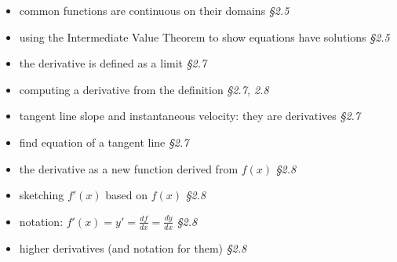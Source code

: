 \documentclass[12pt]{article}
\begin{document}
\begin{itemize}
\begin{itemize}
    \end{itemize}
\item common functions are continuous on their domains  \hfill \emph{\S 2.5}
\item using the Intermediate Value Theorem to show equations have solutions \hfill \emph{\S 2.5}
\item the derivative is defined as a limit  \hfill \emph{\S 2.7}
\item computing a derivative from the definition  \hfill \emph{\S 2.7, 2.8}
\item tangent line slope and instantaneous velocity: they are derivatives  \hfill \emph{\S 2.7}
\item find equation of a tangent line  \hfill \emph{\S 2.7}
\item the derivative as a new function derived from $f(x)$  \hfill \emph{\S 2.8}
\item sketching $f'(x)$ based on $f(x)$  \hfill \emph{\S 2.8}
\item notation: $f'(x)=y'=\frac{df}{dx}=\frac{dy}{dx}$  \hfill \emph{\S 2.8}
\item higher derivatives (and notation for them)  \hfill \emph{\S 2.8}
\end{itemize}
\end{document}
